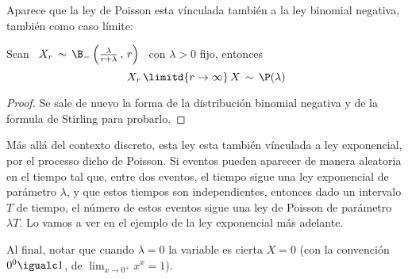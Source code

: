 Aparece  que la  ley de  Poisson esta  v\'inculada tambi\'en  a la  ley binomial
negativa, tambi\'en como caso l\'imite:
%
\begin{lema}
\label{Lem:MP:VinvuloPoissonBinomialNegativa}
%
Sean \ $X_r \, \sim \, \B_-\left( \frac{\lambda}{r+\lambda} \, , \, r \right)$ \
con $\lambda > 0$ fijo, entonces
  \[
  X_r \, \limitd{r \to \infty} \, X \, \sim \, \P(\lambda)
  \]
\end{lema}
\begin{proof}
  Se  sale de nuevo  la forma  de la  distribuci\'on binomial  negativa y  de la
  formula de Stirling para probarlo.
\end{proof}

M\'as all\'a  del contexto discreto, esta  ley esta tambi\'en  v\'inculada a ley
exponencial, por  el processo dicho de  Poisson.  Si eventos  pueden aparecer de
manera aleatoria  en el tiempo tal que,  entre dos eventos, el  tiempo sigue una
ley   exponencial  de   par\'ametro   $\lambda$,  y   que   estos  tiempos   son
independientes, entonces dado  un intervalo $T$ de tiempo,  el n\'umero de estos
eventos sigue una ley de Poisson de  par\'ametro $\lambda T$.  Lo vamos a ver en
el ejemplo de la ley exponencial m\'as adelante.

Al  final, notar  que  cuando  $\lambda =  0$  la variable  es  cierta  $X =  0$
(con la convenci\'on $0^0 \igualc 1$, de $\displaystyle \lim_{x \to 0^+} x^x = 1$).

